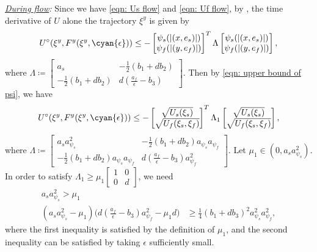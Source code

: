 \noindent\emph{\underline{During flow}:} Since we have \eqref{eqn: Us flow} and \eqref{eqn: Uf flow}, by \cite[pp. 452]{nonlinear_systems_Khalil}, the time derivative of $U$ alone the trajectory $\xi^y$ is given by
\begin{equation*}
     U^\circ(\xi^y, F^y(\xi^y, \cyan{\epsilon})) \leq - 
     \begin{bmatrix}
         \psi_s(|(x,e_s)|) \\ \psi_f(|(y,e_f)|) 
     \end{bmatrix}^T \Lambda \begin{bmatrix}
         \psi_s(|(x,e_s)|) \\ \psi_f(|(y,e_f)|) 
     \end{bmatrix},
\end{equation*}
where $\Lambda \coloneqq \begin{bmatrix}
     a_s & -\tfrac{1}{2}(b_1 + d b_2) \\
    -\tfrac{1}{2}(b_1 + d b_2) & d (\tfrac{a_f}{\epsilon} - b_3)
\end{bmatrix}$. Then by \eqref{eqn: upper bound of psi}, we have
\begin{equation*}
    \begin{aligned}
        U^\circ(\xi^y, F^y(\xi^y, \cyan{\epsilon})) \leq - 
        \begin{bmatrix}
            \sqrt{U_s(\xi_s)} \\ \sqrt{U_f(\xi_s, \xi_f)}
        \end{bmatrix}^T
        \Lambda_1
        \begin{bmatrix}
            \sqrt{U_s(\xi_s)} \\ \sqrt{U_f(\xi_s, \xi_f)}
        \end{bmatrix},
    \end{aligned}
\end{equation*}
where $\Lambda \coloneqq 
    \begin{bmatrix}
        a_s a_{\psi_s}^2 & -\tfrac{1}{2}(b_1 + d b_2)a_{\psi_s}a_{\psi_f} \\
        -\tfrac{1}{2}(b_1 + d b_2)a_{\psi_s}a_{\psi_f} & d (\tfrac{a_f}{\epsilon} - b_3)a_{\psi_f}^2
    \end{bmatrix}$. 
Let $\mu_1 \in (0, a_s a_{\psi_s}^2)$. In order to satisfy $\Lambda_1 \geq \mu_1
    \begin{bmatrix}
        1 & 0 \\ 0 & d
    \end{bmatrix}$, we need 
    \begin{subequations}
\begin{align}
    a_s a_{\psi_s}^2 > \mu_1 \\
    (a_s a_{\psi_s}^2-\mu_1) \big( d (\tfrac{a_f}{\epsilon} - b_3)a_{\psi_f}^2 - \mu_1 d \big) &\geq \tfrac{1}{4}(b_1 + db_3)^2a_{\psi_s}^2a_{\psi_f}^2, \label{eqn: inequality of epsilon Exponential}
\end{align}
\end{subequations}
where the first inequality is satisfied by the definition of $\mu_1$, and the second inequality can be satisfied by taking $\epsilon$ sufficiently small.

